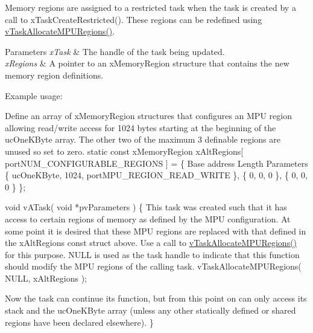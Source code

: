 Memory regions are assigned to a restricted task when the task is created by a call to x\-Task\-Create\-Restricted(). These regions can be redefined using \hyperlink{_common_2_libraries_2_free_r_t_o_s_2_source_2include_2task_8h_a4fd3da9cc010ebb08743f613763c7924}{v\-Task\-Allocate\-M\-P\-U\-Regions()}.


\begin{DoxyParams}{Parameters}
{\em x\-Task} & The handle of the task being updated.\\
\hline
{\em x\-Regions} & A pointer to an x\-Memory\-Region structure that contains the new memory region definitions.\\
\hline
\end{DoxyParams}
Example usage\-: 
\begin{DoxyPre}
Define an array of xMemoryRegion structures that configures an MPU region
allowing read/write access for 1024 bytes starting at the beginning of the
ucOneKByte array.  The other two of the maximum 3 definable regions are
unused so set to zero.
static const xMemoryRegion xAltRegions[ portNUM\_CONFIGURABLE\_REGIONS ] =
\{                                                                                       
Base address            Length          Parameters
        \{ ucOneKByte,           1024,           portMPU\_REGION\_READ\_WRITE \},
        \{ 0,                            0,                      0 \},
        \{ 0,                            0,                      0 \}
\};\end{DoxyPre}



\begin{DoxyPre}void vATask( void *pvParameters )
\{
This task was created such that it has access to certain regions of
memory as defined by the MPU configuration.  At some point it is
desired that these MPU regions are replaced with that defined in the
xAltRegions const struct above.  Use a call to \hyperlink{_common_2_libraries_2_free_r_t_o_s_2_source_2include_2task_8h_a4fd3da9cc010ebb08743f613763c7924}{vTaskAllocateMPURegions()}
for this purpose.  NULL is used as the task handle to indicate that this
function should modify the MPU regions of the calling task.
        vTaskAllocateMPURegions( NULL, xAltRegions );\end{DoxyPre}



\begin{DoxyPre}Now the task can continue its function, but from this point on can only
access its stack and the ucOneKByte array (unless any other statically
defined or shared regions have been declared elsewhere).
\}
   \end{DoxyPre}
 